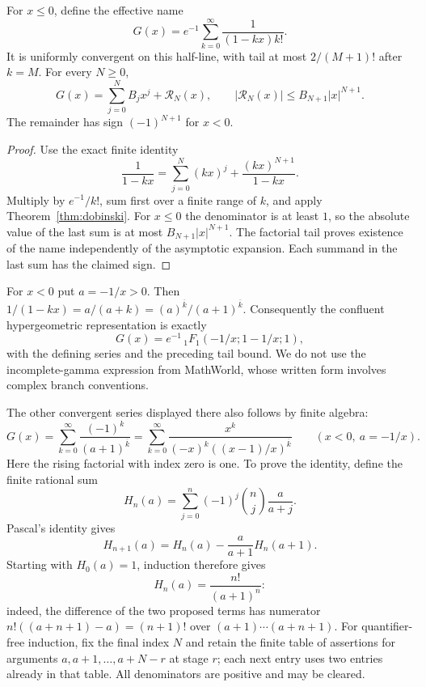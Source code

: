\begin{theorem}
For $x\le0$, define the effective name
\[
 G(x)=e^{-1}\sum_{k=0}^{\infty}\frac1{(1-kx)k!}.
\]
It is uniformly convergent on this half-line, with tail at most
$2/(M+1)!$ after $k=M$.  For every $N\ge0$,
\begin{equation}\label{eq:ordinary-asymptotic}
 G(x)=\sum_{j=0}^N B_jx^j+\mathcal R_N(x),\qquad
 |\mathcal R_N(x)|\le B_{N+1}|x|^{N+1}.
\end{equation}
The remainder has sign $(-1)^{N+1}$ for $x<0$.
\end{theorem}
\begin{proof}
Use the exact finite identity
\[
 \frac1{1-kx}=\sum_{j=0}^N(kx)^j+
                    \frac{(kx)^{N+1}}{1-kx}.
\]
Multiply by $e^{-1}/k!$, sum first over a finite range of $k$, and apply
Theorem~\ref{thm:dobinski}.  For $x\le0$ the denominator is at least $1$,
so the absolute value of the last sum is at most $B_{N+1}|x|^{N+1}$.
The factorial tail proves existence of the name independently of the
asymptotic expansion.  Each summand in the last sum has the claimed sign.
\end{proof}

For $x<0$ put $a=-1/x>0$.  Then
$1/(1-kx)=a/(a+k)=(a)^{\overline k}/(a+1)^{\overline k}$.
Consequently the confluent hypergeometric representation is exactly
\[
 G(x)=e^{-1}\,{}_1F_1(-1/x;1-1/x;1),
\]
with the defining series and the preceding tail bound.  We do not use the
incomplete-gamma expression from MathWorld, whose written form involves
complex branch conventions.

The other convergent series displayed there also follows by finite algebra:
\begin{equation}\label{eq:ordinary-rising-series}
 G(x)=\sum_{k=0}^{\infty}\frac{(-1)^k}{(a+1)^{\overline k}}
     =\sum_{k=0}^{\infty}
       \frac{x^k}{(-x)^k((x-1)/x)^{\overline k}}
       \qquad(x<0,\ a=-1/x).
\end{equation}
Here the rising factorial with index zero is one. To prove the identity,
define the finite rational sum
\[
 H_n(a)=\sum_{j=0}^{n}(-1)^j\binom nj\frac{a}{a+j}.
\]
Pascal's identity gives
\[
 H_{n+1}(a)=H_n(a)-\frac{a}{a+1}H_n(a+1).
\]
Starting with $H_0(a)=1$, induction therefore gives
\begin{equation}\label{eq:finite-beta-sum}
 H_n(a)=\frac{n!}{(a+1)^{\overline n}}:
\end{equation}
indeed, the difference of the two proposed terms has numerator
$n!((a+n+1)-a)=(n+1)!$ over
$(a+1)\cdots(a+n+1)$. For quantifier-free induction, fix the final index
$N$ and retain the finite table of assertions for arguments
$a,a+1,\ldots,a+N-r$ at stage $r$; each next entry uses two entries already
in that table. All denominators are positive and may be cleared.

